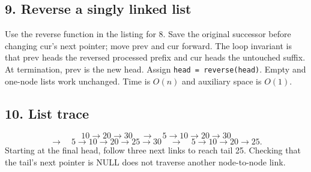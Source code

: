 \documentclass[11pt,a4paper]{article}
\begin{document}
\noindent\begin{minipage}{\linewidth}\subsection*{9. Reverse a singly linked list}
Use the reverse function in the listing for 8. Save the original successor before changing cur's next pointer; move prev and cur forward. The loop invariant is that prev heads the reversed processed prefix and cur heads the untouched suffix. At termination, prev is the new head. Assign \texttt{head = reverse(head)}. Empty and one-node lists work unchanged. Time is $O(n)$ and auxiliary space is $O(1)$.
\end{minipage}\par\medskip
\noindent\begin{minipage}{\linewidth}\subsection*{10. List trace}

\[
10\to20\to30
\quad\longrightarrow\quad5\to10\to20\to30
\]
\[
\longrightarrow\quad5\to10\to20\to25\to30
\quad\longrightarrow\quad\boxed{5\to10\to20\to25}.
\]
Starting at the final head, follow three next links to reach tail 25. Checking that the tail's next pointer is NULL does not traverse another node-to-node link.
\end{minipage}\par\medskip
\end{document}
